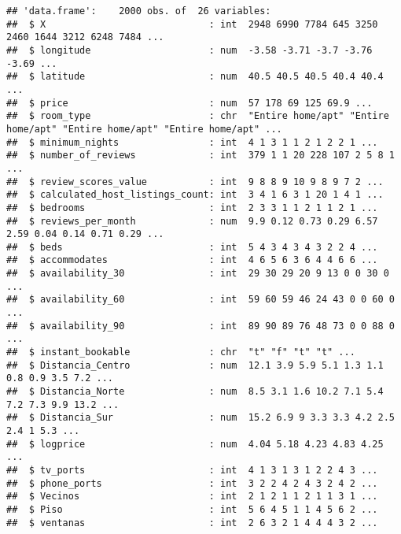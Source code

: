 \documentclass[
]{article}
\begin{document}
\begin{verbatim}
## 'data.frame':    2000 obs. of  26 variables:
##  $ X                             : int  2948 6990 7784 645 3250 2460 1644 3212 6248 7484 ...
##  $ longitude                     : num  -3.58 -3.71 -3.7 -3.76 -3.69 ...
##  $ latitude                      : num  40.5 40.5 40.5 40.4 40.4 ...
##  $ price                         : num  57 178 69 125 69.9 ...
##  $ room_type                     : chr  "Entire home/apt" "Entire home/apt" "Entire home/apt" "Entire home/apt" ...
##  $ minimum_nights                : int  4 1 3 1 1 2 1 2 2 1 ...
##  $ number_of_reviews             : int  379 1 1 20 228 107 2 5 8 1 ...
##  $ review_scores_value           : int  9 8 8 9 10 9 8 9 7 2 ...
##  $ calculated_host_listings_count: int  3 4 1 6 3 1 20 1 4 1 ...
##  $ bedrooms                      : int  2 3 3 1 1 2 1 1 2 1 ...
##  $ reviews_per_month             : num  9.9 0.12 0.73 0.29 6.57 2.59 0.04 0.14 0.71 0.29 ...
##  $ beds                          : int  5 4 3 4 3 4 3 2 2 4 ...
##  $ accommodates                  : int  4 6 5 6 3 6 4 4 6 6 ...
##  $ availability_30               : int  29 30 29 20 9 13 0 0 30 0 ...
##  $ availability_60               : int  59 60 59 46 24 43 0 0 60 0 ...
##  $ availability_90               : int  89 90 89 76 48 73 0 0 88 0 ...
##  $ instant_bookable              : chr  "t" "f" "t" "t" ...
##  $ Distancia_Centro              : num  12.1 3.9 5.9 5.1 1.3 1.1 0.8 0.9 3.5 7.2 ...
##  $ Distancia_Norte               : num  8.5 3.1 1.6 10.2 7.1 5.4 7.2 7.3 9.9 13.2 ...
##  $ Distancia_Sur                 : num  15.2 6.9 9 3.3 3.3 4.2 2.5 2.4 1 5.3 ...
##  $ logprice                      : num  4.04 5.18 4.23 4.83 4.25 ...
##  $ tv_ports                      : int  4 1 3 1 3 1 2 2 4 3 ...
##  $ phone_ports                   : int  3 2 2 4 2 4 3 2 4 2 ...
##  $ Vecinos                       : int  2 1 2 1 1 2 1 1 3 1 ...
##  $ Piso                          : int  5 6 4 5 1 1 4 5 6 2 ...
##  $ ventanas                      : int  2 6 3 2 1 4 4 4 3 2 ...
\end{verbatim}
\end{document}
